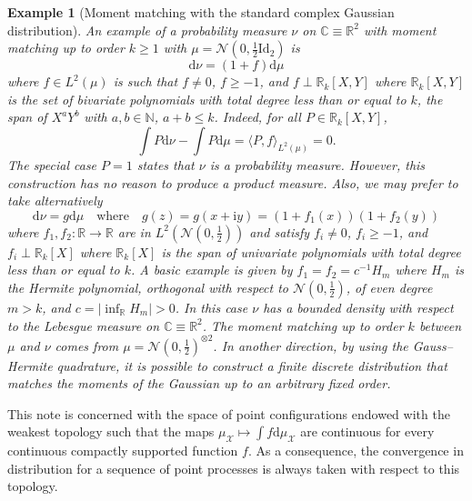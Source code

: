 \documentclass[10pt,reqno]{amsart}
\newcommand{\dd}{\mathrm{d}}
\newcommand{\ii}{\mathrm{i}}
\newcommand{\<}{\langle}
\renewcommand{\>}{\rangle}
\numberwithin{equation}{section}
\newtheorem{example}[theorem]{Example}%
\begin{document}
\begin{example}[Moment matching with the standard complex Gaussian distribution]
An example of a probability measure $\nu$ on $\mathbb{C}\equiv\mathbb{R}^2$ with moment matching up to order $k\geq1$ with
$\mu=\mathcal{N}(0,\frac{1}{2}\mathrm{Id}_2)$ is 
\begin{equation}
\dd\nu=(1+f)\dd\mu
\end{equation}
where $f\in L^2(\mu)$ is such that 
$f\neq0$, $f\geq-1$, and $f\perp\mathbb{R}_k[X,Y]$ where $\mathbb{R}_k[X,Y]$ is the set of bivariate polynomials with total degree less than or equal to $k$, the span of $X^aY^b$ with $a,b\in\mathbb{N}$, $a+b\leq k$. Indeed, for all $P\in\mathbb{R}_k[X,Y]$,
\begin{equation}
\int P\dd\nu-\int P\dd\mu=\langle P,f\rangle_{L^2(\mu)}=0.
\end{equation}
The special case $P=1$ states that $\nu$ is a probability measure. 
However, this construction has no reason to produce a product measure. Also, we may prefer to take alternatively 
\begin{equation}
\dd\nu=g\dd\mu
\quad\text{where}\quad
g(z)=g(x+\ii y)=(1+f_1(x))(1+f_2(y))
\end{equation}
where $f_1,f_2:\mathbb{R}\to\mathbb{R}$ are in $L^2(\mathcal{N}(0,\frac{1}{2}))$ and satisfy
$f_i\neq0$, $f_i\geq-1$, and $f_i\perp\mathbb{R}_k[X]$ where $\mathbb{R}_k[X]$ is the span of univariate polynomials with total degree less than or equal to $k$. A basic example is given by $f_1=f_2=c^{-1}H_m$ where $H_m$ is the Hermite polynomial, orthogonal with respect to $\mathcal{N}(0,\frac{1}{2})$, of even degree $m>k$, and $c=|\inf_{\mathbb{R}}H_m|>0$. In this case $\nu$ has a bounded density with respect to the Lebesgue measure on $\mathbb{C}\equiv\mathbb{R}^2$. The moment matching up to order $k$ between $\mu$ and $\nu$ comes from $\mu=\mathcal{N}(0,\frac{1}{2})^{\otimes 2}$.
In another direction, by using the Gauss--Hermite quadrature, it is possible to construct a finite discrete distribution that matches the moments of the Gaussian up to an arbitrary fixed order.
\end{example}

This note is concerned with the space of 
point configurations endowed with the 
weakest topology such that the maps
$\mu_{\mathcal X} \mapsto \int f\mathrm d \mu_{\mathcal X}$
are continuous
for every continuous
compactly supported function $f$.
As a consequence, the convergence in distribution
for a sequence of point processes
is always taken with respect to this topology.
\end{document}
